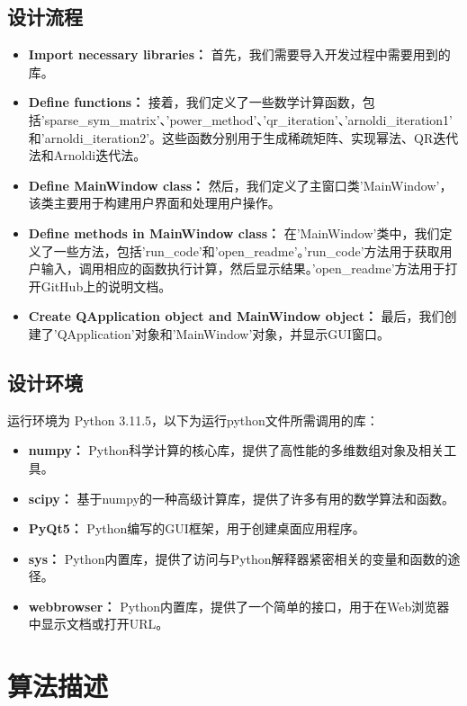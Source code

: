 \documentclass{source/Report}
\begin{document}
    \subsection{设计流程}
    \begin{itemize}
      \item \textbf{Import necessary libraries：} 首先，我们需要导入开发过程中需要用到的库。
      \item \textbf{Define functions：} 接着，我们定义了一些数学计算函数，包括'sparse\_sym\_matrix'、'power\_method'、'qr\_iteration'、'arnoldi\_iteration1'和'arnoldi\_iteration2'。这些函数分别用于生成稀疏矩阵、实现幂法、QR迭代法和Arnoldi迭代法。
      \item \textbf{Define MainWindow class：} 然后，我们定义了主窗口类'MainWindow'，该类主要用于构建用户界面和处理用户操作。
      \item \textbf{Define methods in MainWindow class：} 在'MainWindow'类中，我们定义了一些方法，包括'run\_code'和'open\_readme'。'run\_code'方法用于获取用户输入，调用相应的函数执行计算，然后显示结果。'open\_readme'方法用于打开GitHub上的说明文档。
      \item \textbf{Create QApplication object and MainWindow object：} 最后，我们创建了'QApplication'对象和'MainWindow'对象，并显示GUI窗口。
    \end{itemize}
    
    \subsection{设计环境}
    运行环境为 Python 3.11.5，以下为运行python文件所需调用的库：
    \begin{itemize}
      \item \textbf{numpy：} Python科学计算的核心库，提供了高性能的多维数组对象及相关工具。
      \item \textbf{scipy：} 基于numpy的一种高级计算库，提供了许多有用的数学算法和函数。
      \item \textbf{PyQt5：} Python编写的GUI框架，用于创建桌面应用程序。
      \item \textbf{sys：} Python内置库，提供了访问与Python解释器紧密相关的变量和函数的途径。
      \item \textbf{webbrowser：} Python内置库，提供了一个简单的接口，用于在Web浏览器中显示文档或打开URL。
    \end{itemize}
    
    \section{算法描述}
        
\end{document}
